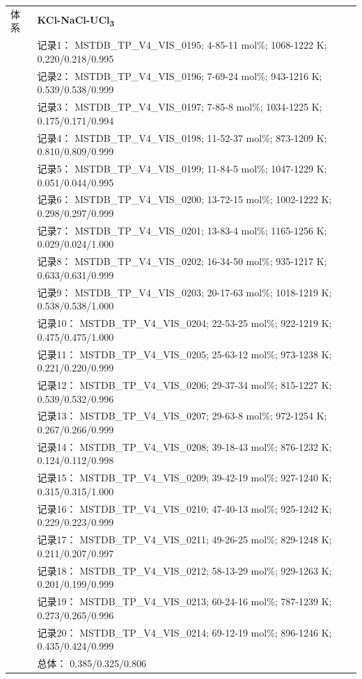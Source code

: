 \documentclass[12pt]{article}
\begin{document}
{\begin{longtable}[]{@{}
  >{\raggedright\arraybackslash}p{}
  >{\raggedright\arraybackslash}p{}@{}}
\midrule
体系 & \textbf{KCl-NaCl-UCl\textsubscript{3}} \\
 & 记录1： MSTDB\_TP\_V4\_VIS\_0195; 4-85-11 mol\%; 1068-1222 K; 0.220/0.218/0.995 \\
 & 记录2： MSTDB\_TP\_V4\_VIS\_0196; 7-69-24 mol\%; 943-1216 K; 0.539/0.538/0.999 \\
 & 记录3： MSTDB\_TP\_V4\_VIS\_0197; 7-85-8 mol\%; 1034-1225 K; 0.175/0.171/0.994 \\
 & 记录4： MSTDB\_TP\_V4\_VIS\_0198; 11-52-37 mol\%; 873-1209 K; 0.810/0.809/0.999 \\
 & 记录5： MSTDB\_TP\_V4\_VIS\_0199; 11-84-5 mol\%; 1047-1229 K; 0.051/0.044/0.995 \\
 & 记录6： MSTDB\_TP\_V4\_VIS\_0200; 13-72-15 mol\%; 1002-1222 K; 0.298/0.297/0.999 \\
 & 记录7： MSTDB\_TP\_V4\_VIS\_0201; 13-83-4 mol\%; 1165-1256 K; 0.029/0.024/1.000 \\
 & 记录8： MSTDB\_TP\_V4\_VIS\_0202; 16-34-50 mol\%; 935-1217 K; 0.633/0.631/0.999 \\
 & 记录9： MSTDB\_TP\_V4\_VIS\_0203; 20-17-63 mol\%; 1018-1219 K; 0.538/0.538/1.000 \\
 & 记录10： MSTDB\_TP\_V4\_VIS\_0204; 22-53-25 mol\%; 922-1219 K; 0.475/0.475/1.000 \\
 & 记录11： MSTDB\_TP\_V4\_VIS\_0205; 25-63-12 mol\%; 973-1238 K; 0.221/0.220/0.999 \\
 & 记录12： MSTDB\_TP\_V4\_VIS\_0206; 29-37-34 mol\%; 815-1227 K; 0.539/0.532/0.996 \\
 & 记录13： MSTDB\_TP\_V4\_VIS\_0207; 29-63-8 mol\%; 972-1254 K; 0.267/0.266/0.999 \\
 & 记录14： MSTDB\_TP\_V4\_VIS\_0208; 39-18-43 mol\%; 876-1232 K; 0.124/0.112/0.998 \\
 & 记录15： MSTDB\_TP\_V4\_VIS\_0209; 39-42-19 mol\%; 927-1240 K; 0.315/0.315/1.000 \\
 & 记录16： MSTDB\_TP\_V4\_VIS\_0210; 47-40-13 mol\%; 925-1242 K; 0.229/0.223/0.999 \\
 & 记录17： MSTDB\_TP\_V4\_VIS\_0211; 49-26-25 mol\%; 829-1248 K; 0.211/0.207/0.997 \\
 & 记录18： MSTDB\_TP\_V4\_VIS\_0212; 58-13-29 mol\%; 929-1263 K; 0.201/0.199/0.999 \\
 & 记录19： MSTDB\_TP\_V4\_VIS\_0213; 60-24-16 mol\%; 787-1239 K; 0.273/0.265/0.996 \\
 & 记录20： MSTDB\_TP\_V4\_VIS\_0214; 69-12-19 mol\%; 896-1246 K; 0.435/0.424/0.999 \\
 & 总体： 0.385/0.325/0.806  \\


\end{longtable}}
\end{document}

